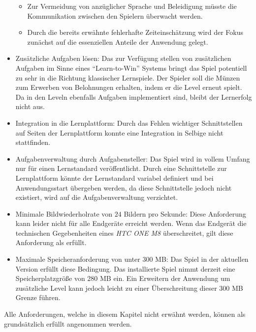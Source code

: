 \begin{itemize}
\begin{itemize}
        \item{Zur Vermeidung von anzüglicher Sprache und Beleidigung müsste die Kommunikation zwischen den Spielern überwacht werden.}
        \item{Durch die bereits erwähnte fehlerhafte Zeiteinschätzung wird der Fokus zunächst auf die essenziellen Anteile der Anwendung gelegt.}
    \end{itemize}
    \item{\label{zusätzlicheAufgaben}Zusätzliche Aufgaben lösen: Das zur Verfügung stellen von zusätzlichen Aufgaben im Sinne eines \enquote{Learn-to-Win} Systems bringt das Spiel potentiell zu sehr in die Richtung klassischer Lernspiele. Der Spieler soll die Münzen zum Erwerben von Belohnungen erhalten, indem er die Level erneut spielt. Da in den Leveln ebenfalls Aufgaben implementiert sind, bleibt der Lernerfolg nicht aus.}
    \item{Integration in die Lernplattform: Durch das Fehlen wichtiger Schnittstellen auf Seiten der Lernplattform konnte eine Integration in Selbige nicht stattfinden.}
    \item{Aufgabenverwaltung durch Aufgabensteller: Das Spiel wird in vollem Umfang nur für einen Lernstandard veröffentlicht. Durch eine Schnittstelle zur Lernplattform könnte der Lernstandard variabel definiert und bei Anwendungsstart übergeben werden, da diese Schnittstelle jedoch nicht existiert, wird auf die Aufgabenverwaltung verzichtet.}
    \item{Minimale Bildwiederholrate von $24$ Bildern pro Sekunde: Diese Anforderung kann leider nicht für alle Endgeräte erreicht werden. Wenn das Endgerät die technischen Gegebenheiten eines \emph{HTC ONE M8} überschreitet, gilt diese Anforderung als erfüllt.}
    \item{Maximale Speicheranforderung von unter $300$ MB: Das Spiel in der aktuellen Version erfüllt diese Bedingung. Das installierte Spiel nimmt derzeit eine Speicherplatzgröße von $280$ MB ein. Ein Erweitern der Anwendung um zusätzliche Level kann jedoch leicht zu einer Überschreitung dieser $300$ MB Grenze führen.}
\end{itemize}
Alle Anforderungen, welche in diesem Kapitel nicht erwähnt werden, können als grundsätzlich erfüllt angenommen werden.

